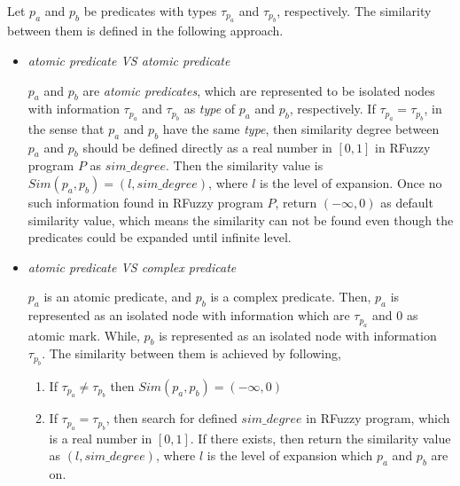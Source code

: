 Let $p_a$ and $p_b$ be predicates with types $\tau_{p_a}$ and $\tau_{p_b}$, respectively. The similarity between them is defined in the following approach.
\begin{itemize}
 \item \textit{atomic predicate VS atomic predicate} 

   $p_a$ and $p_b$ are \textit{atomic predicates}, which are represented to be isolated nodes with information $\tau_{p_a}$ and $\tau_{p_b}$ as \textit{type} of $p_a$ and $p_b$, respectively. If $\tau_{p_a}=\tau_{p_b}$, in the sense that $p_a$ and $p_b$ have the same \textit{type}, then similarity degree between $p_a$ and $p_b$ should be defined directly as a real number in $[0,1]$ in RFuzzy program $P$ as $sim\_degree$. Then the similarity value is $Sim(p_a,p_b)=(l,sim\_degree)$, where $l$ is the level of expansion. Once no such information found in RFuzzy program $P$, return $(-\infty,0)$ as default similarity value, which means the similarity can not be found even though the predicates could be expanded until infinite level.


 \item \textit{atomic predicate VS complex predicate}

   $p_a$ is an atomic predicate, and $p_b$ is a complex predicate.
   Then, $p_a$ is represented as an isolated node with information which are $\tau_{p_a}$ and $0$ as  atomic  mark. While, $p_b$ is represented as an isolated node with information $\tau_{p_b}$. The similarity between them is achieved by following,

   \begin{enumerate}
    \item If $\tau_{p_a} \neq \tau_{p_b}$ then $Sim(p_a,p_b) = (-\infty,0)$

    \item If $\tau_{p_a} = \tau_{p_b}$, then search for defined $sim\_degree$ in RFuzzy program, which is a real number in $[0,1]$. If there exists, then return the similarity value as $(l,sim\_degree)$, where $l$ is the level of expansion which $p_a$ and $p_b$ are on. 
 

\end{enumerate}
\end{itemize}
